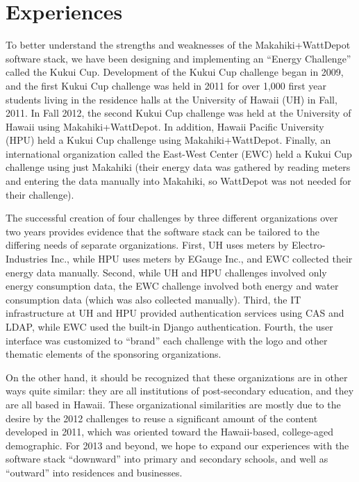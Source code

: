 \section{Experiences}


To better understand the strengths and weaknesses of the Makahiki+WattDepot software stack, we have been designing and implementing an ``Energy Challenge'' called the Kukui Cup.  Development of the Kukui Cup challenge began in 2009, and the first Kukui Cup challenge was held in 2011 for over 1,000 first year students living in the residence halls at the University of Hawaii (UH) in Fall, 2011.  In Fall 2012, the second Kukui Cup challenge was held at the University of Hawaii using Makahiki+WattDepot.  In addition, Hawaii Pacific University (HPU) held a Kukui Cup challenge using Makahiki+WattDepot. Finally, an international organization called the East-West Center (EWC) held a Kukui Cup challenge using just Makahiki (their energy data was gathered by reading meters and entering the data manually into Makahiki, so WattDepot was not needed for their challenge).    

The successful creation of four challenges by three different organizations over two years provides evidence that the software stack can be tailored to the differing needs of separate organizations.  First, UH uses meters by Electro-Industries Inc., while HPU uses meters by EGauge Inc., and EWC collected their energy data manually. Second, while UH and HPU challenges involved only energy consumption data, the EWC challenge involved both energy and water consumption data (which was also collected manually).  Third, the IT infrastructure at UH and HPU provided authentication services using CAS and LDAP, while EWC used the built-in Django authentication. Fourth, the user interface was customized to ``brand'' each challenge with the logo and other thematic elements of the sponsoring organizations. 

On the other hand, it should be recognized that these organizations are in other ways quite similar: they are all institutions of post-secondary education, and they are all based in Hawaii.  These organizational similarities are mostly due to the desire by the 2012 challenges to reuse a significant amount of the content developed in 2011, which was oriented toward the Hawaii-based, college-aged demographic. For 2013 and beyond, we hope to expand our experiences with the software stack  ``downward'' into primary and secondary schools, and well as ``outward'' into residences and businesses. 


